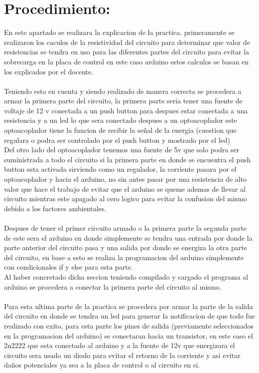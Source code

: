 \documentclass[12pt,a4paper]{article}
\begin{document}
\section{Procedimiento:}
En este apartado se realizara la explicacion de la practica.
primeramente se realizaron los caculos de la resistividad del circuito para determinar que valor de resistencias se tendra en uso para las diferentes partes del circuito para evitar la sobrecarga en la placa de control en este caso arduino  estos calculos se basan en los explicados por el docente.\\\\
Teniendo esto en cuenta y siendo realizado de manera correcta se procedera a armar la primera parte del circuito, la primera parte seria tener una fuente de voltaje de 12 v conectada a un push button para despues estar conectada a una resistencia y a un led lo que sera conectado despues a un optoacoplador este optoacoplador tiene la funcion de recibir la señal de la energia (cuestion que regulara o podra ser controlado por el push button y mostrado por el led)\\
Del otro lado del optoacoplador tenemos una fuente de 5v que solo podra ser suministrada a todo el circuito si la primera parte en donde se encuentra el push button esta activada sirviendo como un regulador, la corriente pasara por el optoacoplador y hacia el arduino, no sin antes pasar por una resistencia de alto valor que hace el trabajo de evitar que el arduino se queme ademas de llevar al circuito mientras este apagado al  cero logico para evitar la confusion del mismo debido a los factores ambientales.\\\\
Despues de tener el primer circuito armado o la primera parte la segunda parte de este sera el arduino en donde simplemente se tendra una entrada por donde la parte anterior del circuito pasa y una salida por donde se energiza la otra parte del circuito, en base a esto se realiza la programacion del arduino simplemente con condicionales if y else para esta parte.\\
Al haber concretado dicha seccion teniendo compilado y cargado el programa al arduino se procedera a conectar la primera parte del circuito al mismo.\\\\
Para esta ultima parte de la practica se procedera por armar la parte de la salida del circuito en donde se tendra un led para generar la notificacion de que todo fue realizado con exito, para esta parte los pines de salida (previamente seleccionados en la programacion del arduino) se conectaran hacia un transistor, en este caso el 2n2222 que esta conectado al arduino y a la fuente de 12v que energizara el circuito sera usado un diodo para evitar el retorno de la corriente y asi evitar daños potenciales ya sea a la placa de control o al circuito en si.\\
\end{document}
